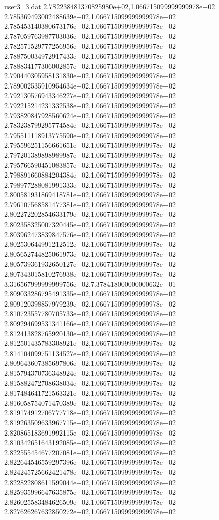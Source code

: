 \begin{filecontents}{user3_3.dat}
2.782238481370825980e+02,1.066715099999999978e+02
2.785369493002488639e+02,1.066715099999999978e+02
2.785453140380673176e+02,1.066715099999999978e+02
2.787059763987703036e+02,1.066715099999999978e+02
2.782571529777256956e+02,1.066715099999999978e+02
2.788750034972917433e+02,1.066715099999999978e+02
2.788834177306002857e+02,1.066715099999999978e+02
2.790440305958131830e+02,1.066715099999999978e+02
2.789002535910954634e+02,1.066715099999999978e+02
2.792130576943346227e+02,1.066715099999999978e+02
2.792215214231332538e+02,1.066715099999999978e+02
2.793820847928560624e+02,1.066715099999999978e+02
2.783238799295774584e+02,1.066715099999999978e+02
2.795511118913775590e+02,1.066715099999999978e+02
2.795596251156661651e+02,1.066715099999999978e+02
2.797201389898989987e+02,1.066715099999999978e+02
2.795766590451083857e+02,1.066715099999999978e+02
2.798891660884204384e+02,1.066715099999999978e+02
2.798977288081991333e+02,1.066715099999999978e+02
2.800581931869418781e+02,1.066715099999999978e+02
2.796107568581477381e+02,1.066715099999999978e+02
2.802272202854633179e+02,1.066715099999999978e+02
2.802358325007320445e+02,1.066715099999999978e+02
2.803962473839847576e+02,1.066715099999999978e+02
2.802530644991212512e+02,1.066715099999999978e+02
2.805652744825061973e+02,1.066715099999999978e+02
2.805739361932650127e+02,1.066715099999999978e+02
2.807343015810276938e+02,1.066715099999999978e+02
3.316567999999999756e+02,7.378418000000000632e+01
2.809033286795491335e+02,1.066715099999999978e+02
2.809120398857979239e+02,1.066715099999999978e+02
2.810723557780705733e+02,1.066715099999999978e+02
2.809294699531341166e+02,1.066715099999999978e+02
2.812413828765920130e+02,1.066715099999999978e+02
2.812501435783308921e+02,1.066715099999999978e+02
2.814104099751134527e+02,1.066715099999999978e+02
2.809643607385697806e+02,1.066715099999999978e+02
2.815794370736348924e+02,1.066715099999999978e+02
2.815882472708638034e+02,1.066715099999999978e+02
2.817484641721563321e+02,1.066715099999999978e+02
2.816058754071470389e+02,1.066715099999999978e+02
2.819174912706777718e+02,1.066715099999999978e+02
2.819263509633967715e+02,1.066715099999999978e+02
2.820865183691992115e+02,1.066715099999999978e+02
2.810342651643192085e+02,1.066715099999999978e+02
2.822555454677207081e+02,1.066715099999999978e+02
2.822644546559297396e+02,1.066715099999999978e+02
2.824245725662421478e+02,1.066715099999999978e+02
2.822822808611599044e+02,1.066715099999999978e+02
2.825935996647635875e+02,1.066715099999999978e+02
2.826025583484626509e+02,1.066715099999999978e+02
2.827626267632850272e+02,1.066715099999999978e+02

\end{filecontents}
